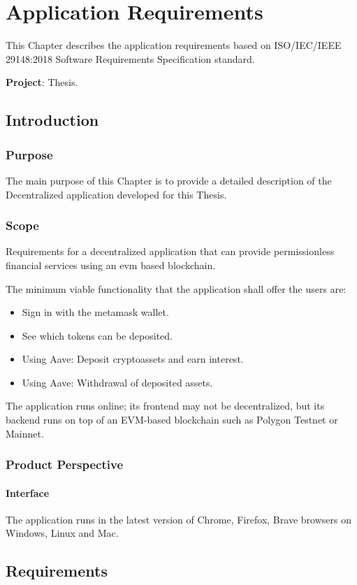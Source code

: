 \documentclass[11pt,a4paper]{report}
\begin{document}
\chapter{Application Requirements} \label{ch:appreq}
This Chapter describes the application requirements based on ISO/IEC/IEEE 29148:2018\cite{iso} Software Requirements Specification standard.

\textbf{Project}: Thesis.
\section{Introduction}
\subsection{Purpose}
The main purpose of this Chapter is to provide a detailed description of the Decentralized application developed for this Thesis. 
\subsection{Scope}
Requirements for a decentralized application that can provide
permissionless financial services using an evm based blockchain.

The minimum viable functionality that the application shall offer the users are:
\begin{itemize}
	\item Sign in with the metamask wallet.
	\item See which tokens can be deposited.
	\item Using Aave: Deposit cryptoassets and earn interest. 
	\item Using Aave: Withdrawal of deposited assets.
\end{itemize}
The application runs online; its frontend may not be decentralized, but its backend runs on top of an EVM-based blockchain such as Polygon Testnet or Mainnet.
\subsection{Product Perspective}
\subsubsection{Interface}
The application runs in the latest version of Chrome, Firefox, Brave browsers on Windows, Linux and Mac.

\section{Requirements}
\end{document}

